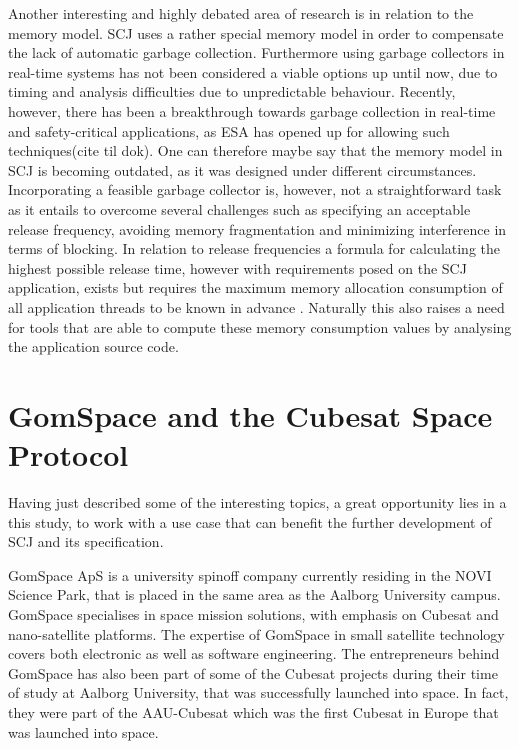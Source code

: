 Another interesting and highly debated area of research is in relation to the memory model. SCJ uses a rather special memory model in order to compensate the lack of automatic garbage collection. Furthermore using garbage collectors in real-time systems has not been considered a viable options up until now, due to timing and analysis difficulties due to unpredictable behaviour. Recently, however, there has been a breakthrough towards garbage collection in real-time and safety-critical applications, as ESA has opened up for allowing such techniques(cite til dok). One can therefore maybe say that the memory model in SCJ is becoming outdated, as it was designed under different circumstances. Incorporating a feasible garbage collector is, however, not a straightforward task as it entails to overcome several challenges such as specifying an acceptable release frequency, avoiding memory fragmentation and minimizing interference in terms of blocking. In relation to release frequencies a formula for calculating the highest possible release time, however with requirements posed on the SCJ application, exists but requires the maximum memory allocation consumption of all application threads to be known in advance \cite{Schoeberl:2007:GCS:1288940.1288953}. Naturally this also raises a need for tools that are able to compute these memory consumption values by analysing the application source code.

\section{GomSpace and the Cubesat Space Protocol} %
\label{sec:gomspace_and_the_cubesat_space_protocol}
Having just described some of the interesting topics, a great opportunity lies in a this study, to work with a use case that can benefit the further development of SCJ and its specification.

GomSpace ApS is a university spinoff company currently residing in the NOVI Science Park, that is placed in the same area as the Aalborg University campus. GomSpace specialises in space mission solutions, with emphasis on Cubesat and nano-satellite platforms\cite{GomSpace}. The expertise of GomSpace in small satellite technology covers both electronic as well as software engineering. The entrepreneurs behind GomSpace has also been part of some of the Cubesat projects during their time of study at Aalborg University, that was successfully launched into space. In fact, they were part of the AAU-Cubesat which was the first Cubesat in Europe that was launched into space.

